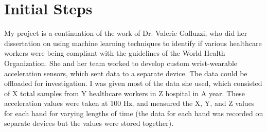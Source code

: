 \documentclass[]{report}
\begin{document}
\section{Initial Steps}

My project is a continuation of the work of Dr. Valerie Galluzzi, who did her dissertation on using machine learning techniques to identify if various healthcare workers were being compliant with the guidelines of the World Health Organization. She and her team worked to develop custom wrist-wearable acceleration sensors, which sent data to a separate device. The data could be offloaded for investigation. I was given most of the data she used, which consisted of X total samples from Y healthcare workers in Z hospital in A year. These acceleration values were taken at 100 Hz, and measured the X, Y, and Z values for each hand for varying lengths of time (the data for each hand was recorded on separate devices but the values were stored together). 
\end{document}
